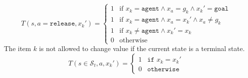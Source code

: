 \begin{equation}\label{eq:Txkrelease}
    T(s,a=\texttt{release}, x_k') = \begin{cases}
             1 & \text{if }x_k =\texttt{agent} \land x_a = g_k \land x_k' = \texttt{goal} \\
             1 & \text{if }x_k =\texttt{agent} \land x_a = x_k' \land x_a \neq g_k \\
             1 & \text{if }x_k\neq \texttt{agent} \land x_k'=x_k \\
             0 & \text{otherwise} 
             \end{cases}
\end{equation}
The item $k$ is not allowed to change value if the current state is a terminal state.
\begin{equation}\label{eq:Txkts}
    T(s\in\mathcal{S}_t, a, x_k') = \begin{cases}1 &\texttt{if }x_k=x_k'\\
         0& \texttt{otherwise}\end{cases}
\end{equation}
